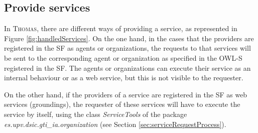\subsection{Provide services}
In \textsc{Thomas}, there are different ways of providing a service, as represented in Figure \ref{fig:handledServices}. On the one hand, in the cases that the providers are registered in the SF as agents or organizations, the requests to that services will be sent to the corresponding agent or organization as specified in the OWL-S registered in the SF. The agents or organizations can execute their service as an internal behaviour or as a web service, but this is not visible to the requester.

On the other hand, if the providers of a service are registered in the SF as web services (groundings), the requester of these services will have to execute the service by itself, using the class \textit{ServiceTools} of the package \textit{es.upv.dsic.gti\_ia.organization} (see Section \ref{sec:serviceRequestProcess}).



